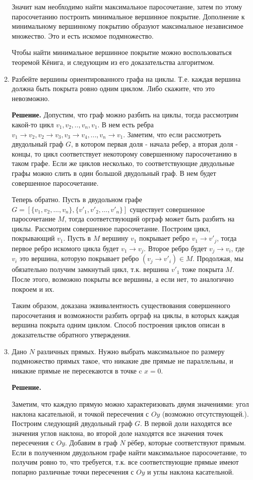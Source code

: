 \begin{enumerate}
	Значит нам необходимо найти максимальное паросочетание, затем по этому паросочетанию построить 
	минимальное вершинное покрытие. Дополнение к минимальному вершинному покрытию образуют максимальное 
	независимое множество. Это и есть искомое подмножество.
	
	Чтобы найти минимальное вершинное покрытие можно воспользоваться теоремой Кёнига, и следующим из его 
	доказательства алгоритмом.
	
	\item Разбейте вершины ориентированного графа на циклы. Т.е. каждая вершина должна быть покрыта ровно одним 
	циклом. Либо скажите, что это невозможно.
	
	\textbf{Решение.} Допустим, что граф можно разбить на циклы, тогда рассмотрим какой-то цикл $v_1, v_2, .., 
	v_n, v_1$. В нем есть ребра $v_1 \to v_2, v_2 \to v_3, v_3 \to v_4,..., v_n \to v_1 $. Заметим, что если 
	рассмотреть двудольный граф $G$, в котором первая доля - начала ребер, а вторая доля - концы, то цикл 
	соответствует некоторому совершенному паросочетанию в таком графе. Если же циклов несколько, то 
	соответствующие двудольные графы можно слить в один большой двудольный граф. В нем будет совершенное 
	паросочетание.
	
	Теперь обратно. Пусть в двудольном графе $G = [\{v_1, v_2, ..., v_n\}, \{v'_1, v'_2, ..., v'_n\}]$ существует 
	совершенное паросочетание $M$, тогда соответствующий орграф может быть разбить на циклы. Рассмотрим 
	совершенное паросочетание. Построим цикл, покрывающий $v_1$. Пусть в $M$ вершину $v_1$ покрывает ребро $v_1 
	\to v'_j$, тогда первое ребро искомого цикла будет $v_1 \to v_j$. Второе ребро будет $v_j \to v_i$, где $v_i$ 
	это вершина, которую покрывает ребро $(v_j \to v'_i) \in M$. Продолжая, мы обязательно получим замкнутый 
	цикл, т.к. вершина $v'_1$ тоже покрыта $M$. После этого, возможно покрыты все вершины, а если нет, то 
	аналогично покроем и их.
	
	Таким образом, доказана эквивалентность существования совершенного паросочетания и возможности разбить орграф 
	на циклы, в которых каждая вершина покрыта одним циклом. Способ построения циклов описан в доказательстве 
	обратного утверждения.
	
	\item Дано $N$ различных прямых. Нужно выбрать максимальное по размеру подмножество прямых такое, что никакие 
	две прямые не параллельны, и никакие прямые не пересекаются в точке c $x = 0$.
	
	\textbf{Решение.}
	
	Заметим, что каждую прямую можно характеризовать двумя значениями: угол наклона касательной, и точкой 
	пересечения с $Oy$ (возможно отсутствующей.). Построим следующий двудольный граф $G$. В первой доли находятся 
	все значения углов наклона, во второй доле находятся все значения точек пересечения с $Oy$. Добавим в граф 
	$N$ рёбер, которые соответствуют прямым. Если в полученном двудольном графе найти максимальное паросочетание, 
	то получим ровно то, что требуется, т.к. все соответствующие прямые имеют попарно различные точки пересечения 
	с $Oy$ и углы наклона касательной. 
	 
\end{enumerate}

